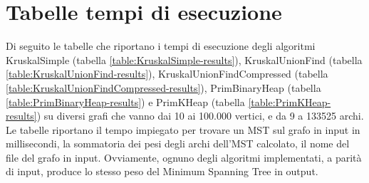 \appendix
\section{Tabelle tempi di esecuzione}
\label{cap:runtime-tables}

Di seguito le tabelle che riportano i tempi di esecuzione degli algoritmi KruskalSimple (tabella \ref{table:KruskalSimple-results}), KruskalUnionFind (tabella \ref{table:KruskalUnionFind-results}), KruskalUnionFindCompressed  (tabella \ref{table:KruskalUnionFindCompressed-results}), PrimBinaryHeap (tabella \ref{table:PrimBinaryHeap-results}) e PrimKHeap (tabella \ref{table:PrimKHeap-results}) su diversi grafi che vanno dai 10 ai 100.000 vertici, e da 9 a 133525 archi. \\

\noindent Le tabelle riportano il tempo impiegato per trovare un MST sul grafo in input in millisecondi, la sommatoria dei pesi degli archi dell'MST calcolato, il nome del file del grafo in input. Ovviamente, ognuno degli algoritmi implementati, a parità di input, produce lo stesso peso del Minimum Spanning Tree in output.

